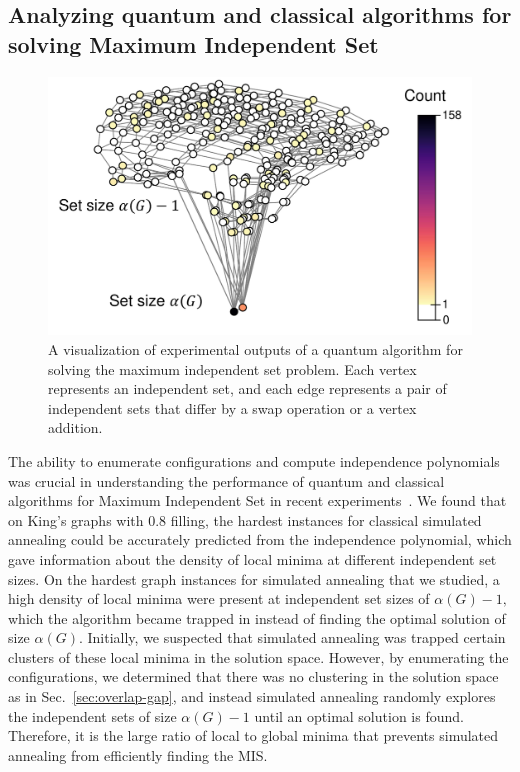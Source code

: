 \documentclass[onefignum, onetabnum]{siamart190516}
\newcommand{\<}{\langle}
\renewcommand{\>}{\rangle}
\begin{document}
\subsection{Analyzing quantum and classical algorithms for solving Maximum Independent Set}
\begin{figure} 
    \centering
    \includegraphics[width=.65\textwidth, trim={0cm 0cm 0cm 0cm}, clip]{figures/exp_configurations.pdf}
    \caption{A visualization of experimental outputs of a quantum algorithm for solving the maximum independent set problem.
    Each vertex represents an independent set, and each edge represents a pair of  independent sets that differ by a swap operation or a vertex addition.}
    \label{fig:exp_configuratoins}
\end{figure}
The ability to enumerate configurations and compute independence polynomials was crucial in understanding the performance of quantum and classical algorithms for Maximum Independent Set in recent experiments~\cite{Ebadi2022}.
We found that on King's graphs with $0.8$ filling, the hardest instances for classical simulated annealing could be accurately predicted from the independence polynomial, which gave information about the density of local minima at different independent set sizes.
On the hardest graph instances for simulated annealing that we studied, a high density of local minima were present at independent set sizes of $\alpha(G)-1,$ which the algorithm became trapped in instead of finding the optimal solution of size $\alpha(G)$.
Initially, we suspected that simulated annealing was trapped certain clusters of these local minima in the solution space. However, by enumerating the configurations, we determined that there was no clustering in the solution space as in Sec.~\ref{sec:overlap-gap}, and instead simulated annealing randomly explores the independent sets of size $\alpha(G)-1$ until an optimal solution is found.
Therefore, it is the large ratio of local to global minima that prevents simulated annealing from efficiently finding the MIS.
\end{document}
